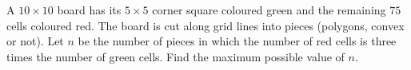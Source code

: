 A $10\times10$ board has its $5\times5$ corner square coloured green and the remaining $75$ cells coloured red. The board is cut along grid lines into pieces (polygons, convex or not). Let $n$ be the number of pieces in which the number of red cells is three times the number of green cells. Find the maximum possible value of $n$.
